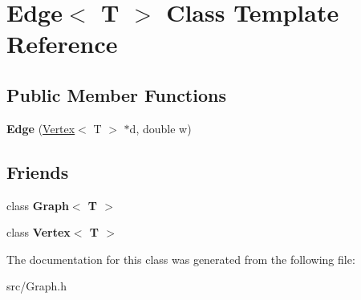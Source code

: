 \hypertarget{class_edge}{}\section{Edge$<$ T $>$ Class Template Reference}
\label{class_edge}
\subsection*{Public Member Functions}
\begin{DoxyCompactItemize}
\item 
\mbox{\label{class_edge_a9da861a03f920c89984be33515a5d870}} 
{\bfseries Edge} (\mbox{\hyperlink{class_vertex}{Vertex}}$<$ T $>$ $\ast$d, double w)
\end{DoxyCompactItemize}
\subsection*{Friends}
\begin{DoxyCompactItemize}
\item 
\mbox{\label{class_edge_aefa9b76cd57411c5354e5620dc2d84dd}} 
class {\bfseries Graph$<$ T $>$}
\item 
\mbox{\label{class_edge_a2e120a12dec663fa334633b4f26cbed8}} 
class {\bfseries Vertex$<$ T $>$}
\end{DoxyCompactItemize}


The documentation for this class was generated from the following file\+:\begin{DoxyCompactItemize}
\item 
src/Graph.\+h\end{DoxyCompactItemize}
